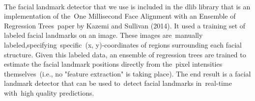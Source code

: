 \paragraph{}
The facial landmark detector that we use is included in the dlib library that is an implementation of the One Millisecond Face Alignment with an Ensemble of Regression Trees paper by Kazemi and Sullivan (2014).\newline
It used a training set of labeled facial landmarks on an image. These images are manually labeled,specifying specific (x, y)-coordinates of regions surrounding each facial structure.\newline
Given this labeled data, an ensemble of regression trees are trained to estimate the facial landmark positions directly from the pixel intensities themselves (i.e., no "feature extraction" is taking place).\newline
The end result is a facial landmark detector that can be used to detect facial landmarks in real-time with high quality predictions.


